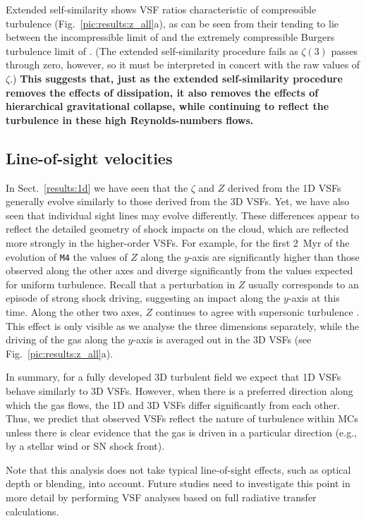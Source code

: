 Extended self-similarity shows VSF ratios characteristic of compressible turbulence (Fig.~\ref{pic:results:z_all}a), as can be seen from their tending to lie between the incompressible limit of \citet{She1994} and the extremely compressible Burgers turbulence limit of \citet{Boldyrev2002}.
(The extended self-similarity procedure fails as $\zeta(3)$ passes through zero, however, so it must be interpreted in concert with the raw values of $\zeta$.)
\textbf{This suggests that, just as the extended self-similarity procedure removes the effects of dissipation, it also removes the effects of hierarchical gravitational collapse, while continuing to reflect the turbulence in these high Reynolds-numbers flows.}


\subsection{Line-of-sight velocities}\label{discussion:1d}

In Sect.~\ref{results:1d} we have seen that the $\zeta$ and $Z$ derived from the 1D VSFs generally evolve similarly to those derived from the 3D VSFs.
Yet, we have also seen that individual sight lines may evolve differently.
These differences appear to reflect the detailed geometry of shock impacts on the cloud, which are reflected more strongly in the higher-order VSFs.
For example, for the first 2~Myr of the evolution of \texttt{M4} the values of $Z$ along the $y$-axis are significantly higher than those observed along the other axes and diverge significantly from the values expected for uniform turbulence.
Recall that a perturbation in $Z$ usually corresponds to an episode of strong shock driving, suggesting an impact along the $y$-axis at this time. 
Along the other two axes, $Z$ continues to agree with supersonic turbulence \citep{Boldyrev2002}.
This effect is only visible as we analyse the three dimensions separately, while the driving of the gas along the $y$-axis is averaged out in the 3D VSFs (see Fig.~\ref{pic:results:z_all}a).

In summary, for a fully developed 3D turbulent field we expect that 1D VSFs behave similarly to 3D VSFs.
However, when there is a preferred direction along which the gas flows, the 1D and 3D VSFs differ significantly from each other. 
Thus, we predict that observed VSFs reflect the nature of turbulence within MCs unless there is clear evidence that the gas is driven in a particular direction (e.g., by a stellar wind or SN shock front).

Note that this analysis does not take typical line-of-sight effects, such as optical depth or blending, into account. 
Future studies need to investigate this point in more detail by performing VSF analyses based on full radiative transfer calculations.



